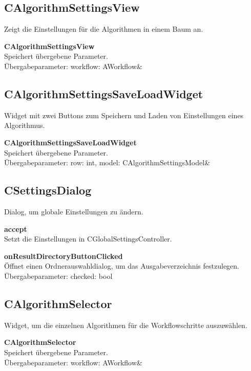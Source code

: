 \subsection{CAlgorithmSettingsView}
Zeigt die Einstellungen für die Algorithmen in einem Baum an.
\beginMembers
\item \textbf{CAlgorithmSettingsView} \\ Speichert übergebene Parameter. \\Übergabeparameter: workflow: AWorkflow\&
\closeMembers

\subsection{CAlgorithmSettingsSaveLoadWidget}
Widget mit zwei Buttons zum Speichern und Laden von Einstellungen eines Algorithmus.
\beginMembers
\item \textbf{CAlgorithmSettingsSaveLoadWidget} \\ Speichert übergebene Parameter. \\Übergabeparameter: row: int, model: CAlgorithmSettingsModel\&
\closeMembers

\subsection{CSettingsDialog}
Dialog, um globale Einstellungen zu ändern.
\beginSlots
\item \textbf{accept} \\Setzt die Einstellungen in CGlobalSettingsController.
\item \textbf{onResultDirectoryButtonClicked} \\Öffnet einen Ordnerauswahldialog, um das Ausgabeverzeichnis festzulegen. \\Übergabeparameter: checked: bool
\closeMembers

\subsection{CAlgorithmSelector}
Widget, um die einzelnen Algorithmen für die Workflowschritte auszuwählen.
\beginMembers
\item \textbf{CAlgorithmSelector} \\Speichert übergebene Parameter. \\Übergabeparameter: workflow: AWorkflow\&
\closeMembers

